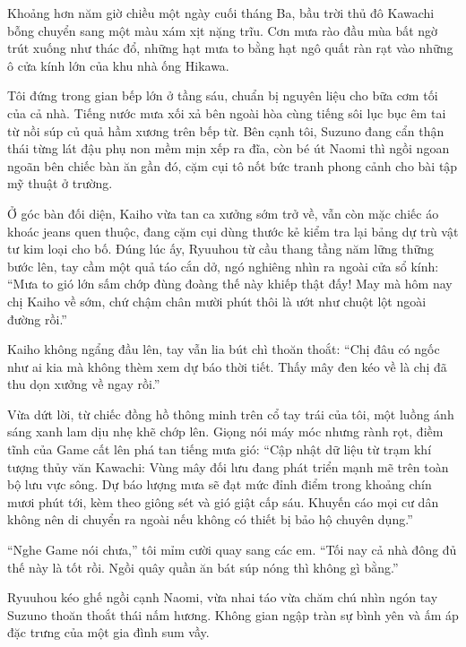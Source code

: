 \documentclass[../main.tex]{subfiles}
\begin{document}


Khoảng hơn năm giờ chiều một ngày cuối tháng Ba, bầu trời thủ đô Kawachi bỗng chuyển sang một màu xám xịt nặng trĩu. Cơn mưa rào đầu mùa bất ngờ trút xuống như thác đổ, những hạt mưa to bằng hạt ngô quất ràn rạt vào những ô cửa kính lớn của khu nhà ống Hikawa.

Tôi đứng trong gian bếp lớn ở tầng sáu, chuẩn bị nguyên liệu cho bữa cơm tối của cả nhà. Tiếng nước mưa xối xả bên ngoài hòa cùng tiếng sôi lục bục êm tai từ nồi súp củ quả hầm xương trên bếp từ. Bên cạnh tôi, Suzuno đang cẩn thận thái từng lát đậu phụ non mềm mịn xếp ra đĩa, còn bé út Naomi thì ngồi ngoan ngoãn bên chiếc bàn ăn gần đó, cặm cụi tô nốt bức tranh phong cảnh cho bài tập mỹ thuật ở trường.

Ở góc bàn đối diện, Kaiho vừa tan ca xưởng sớm trở về, vẫn còn mặc chiếc áo khoác jeans quen thuộc, đang cặm cụi dùng thước kẻ kiểm tra lại bảng dự trù vật tư kim loại cho bố. Đúng lúc ấy, Ryuuhou từ cầu thang tầng năm lững thững bước lên, tay cầm một quả táo cắn dở, ngó nghiêng nhìn ra ngoài cửa sổ kính: ``Mưa to gió lớn sấm chớp đùng đoàng thế này khiếp thật đấy! May mà hôm nay chị Kaiho về sớm, chứ chậm chân mười phút thôi là ướt như chuột lột ngoài đường rồi.''

Kaiho không ngẩng đầu lên, tay vẫn lia bút chì thoăn thoắt: ``Chị đâu có ngốc như ai kia mà không thèm xem dự báo thời tiết. Thấy mây đen kéo về là chị đã thu dọn xưởng về ngay rồi.''

Vừa dứt lời, từ chiếc đồng hồ thông minh trên cổ tay trái của tôi, một luồng ánh sáng xanh lam dịu nhẹ khẽ chớp lên. Giọng nói máy móc nhưng rành rọt, điềm tĩnh của Game cất lên phá tan tiếng mưa gió: ``Cập nhật dữ liệu từ trạm khí tượng thủy văn Kawachi: Vùng mây đối lưu đang phát triển mạnh mẽ trên toàn bộ lưu vực sông. Dự báo lượng mưa sẽ đạt mức đỉnh điểm trong khoảng chín mươi phút tới, kèm theo giông sét và gió giật cấp sáu. Khuyến cáo mọi cư dân không nên di chuyển ra ngoài nếu không có thiết bị bảo hộ chuyên dụng.''

``Nghe Game nói chưa,'' tôi mỉm cười quay sang các em. ``Tối nay cả nhà đông đủ thế này là tốt rồi. Ngồi quây quần ăn bát súp nóng thì không gì bằng.''

Ryuuhou kéo ghế ngồi cạnh Naomi, vừa nhai táo vừa chăm chú nhìn ngón tay Suzuno thoăn thoắt thái nấm hương. Không gian ngập tràn sự bình yên và ấm áp đặc trưng của một gia đình sum vầy.
\end{document}
